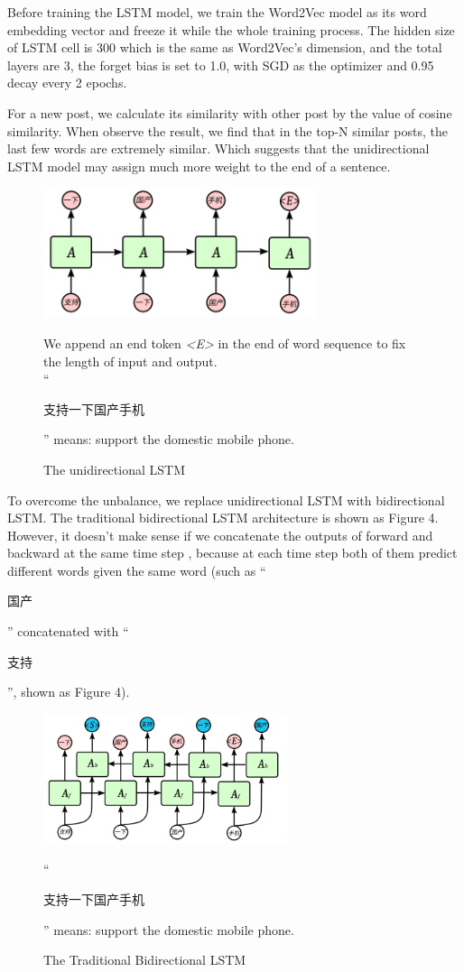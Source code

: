 \documentclass{sig-alternate}
\begin{document}
Before training the LSTM model, we train the Word2Vec model as its word embedding 
vector and freeze it while the whole training process. The hidden size of LSTM 
cell is 300 which is the same as Word2Vec’s dimension, and the total layers
are 3, the forget bias is set to 1.0, with SGD as the optimizer and 0.95 decay 
every 2 epochs. 

For a new post, we calculate its 
similarity with other post by the value of cosine similarity. When observe 
the result, we find that in the top-N similar posts, the last few words are 
extremely similar. Which suggests that the unidirectional LSTM 
model may assign much more weight to the end of a sentence. 

\begin{figure}
  \centering
  \includegraphics[height=1.5in, width=3.15in]{unilstm.png}
  \caption{The unidirectional LSTM}{We append an end token \emph{<E>} in the end of word sequence to fix the length of input and output. \\ “\begin{CJK}{UTF8}{gbsn}支持一下国产手机\end{CJK}” means: support the domestic mobile phone.}
\end{figure}

To overcome the unbalance, we replace unidirectional LSTM with bidirectional 
LSTM. The traditional bidirectional LSTM architecture is shown as Figure 4.
However, it doesn’t make sense if we concatenate the outputs of forward and 
backward at the same time step , because at each time step both of them
predict different words given the same word (such as “\begin{CJK}{UTF8}{gbsn}国产\end{CJK}” concatenated with “\begin{CJK}{UTF8}{gbsn}支持\end{CJK}”, shown as Figure 4).

\begin{figure}
  \centering
  \includegraphics[height=1.5in, width=2.81in]{bilstm1.png}
  \caption{The Traditional Bidirectional LSTM}{“\begin{CJK}{UTF8}{gbsn}支持一下国产手机\end{CJK}” means: support the domestic mobile phone.}
\end{figure}
\end{document}
